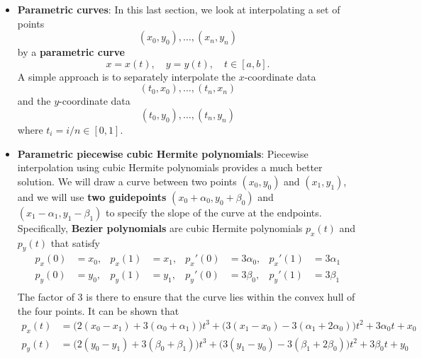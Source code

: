 \documentclass{report}
\begin{document}
\begin{itemize}
    \item \textbf{Parametric curves}:
        In this last section, we look at interpolating a set of points 
        $$(x_0, y_0), \ldots, (x_n, y_n)$$
        by a \textbf{parametric curve}
        $$x = x(t), \quad y = y(t), \quad t \in [a,b].$$
        A simple approach is to separately interpolate the $x$-coordinate data
        $$(t_0, x_0), \ldots, (t_n, x_n)$$
        and the $y$-coordinate data
        $$(t_0, y_0), \ldots, (t_n, y_n)$$
        where $t_i = i/n \in [0, 1]$.
    \item \textbf{ Parametric piecewise cubic Hermite polynomials}:
        Piecewise interpolation using cubic Hermite polynomials provides a much better solution.
        \bigbreak \noindent 
        We will draw a curve between two points $(x_0,y_0)$ and $(x_1,y_1)$, and we will use \textbf{two guidepoints} $(x_0+\alpha_0,y_0+\beta_0)$ and $(x_1-\alpha_1,y_1-\beta_1)$ to specify the slope of the curve at the endpoints.
        \bigbreak \noindent 
        Specifically, \textbf{Bezier polynomials} are cubic Hermite polynomials $p_x(t)$ and $p_y(t)$ that satisfy
        \begin{align*}
            p_x(0) &= x_0, &p_x(1) &= x_1, &p_x'(0) &= 3\alpha_0, &p_x'(1) &= 3\alpha_1\\
            p_y(0) &= y_0, &p_y(1) &= y_1, &p_y'(0) &= 3\beta_0,  &p_y'(1) &= 3\beta_1\\
        \end{align*}
        The factor of 3 is there to ensure that the curve lies within the convex hull of the four points.
        \bigbreak \noindent 
        It can be shown that
        \begin{align*}
            p_x(t) &= \big(2(x_0 - x_1) + 3(\alpha_0 + \alpha_1)\big) t^3 + \big(3(x_1 - x_0) - 3(\alpha_1 + 2\alpha_0)\big) t^2 + 3\alpha_0 t + x_0\\
            p_y(t) &= \big(2(y_0 - y_1) + 3(\beta_0 + \beta_1)\big) t^3 + \big(3(y_1 - y_0) - 3(\beta_1 + 2\beta_0)\big) t^2 + 3\beta_0 t + y_0\\
        \end{align*}


     \end{itemize}

     \pagebreak 
\end{document}
